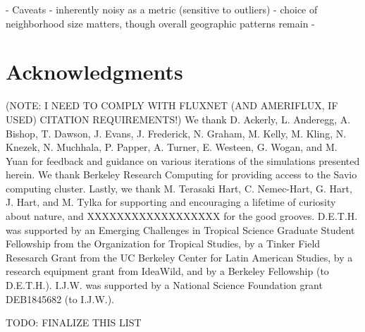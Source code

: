 \documentclass[12pt]{article}
\begin{document}
- Caveats
  - inherently noisy as a metric (sensitive to outliers)
  - choice of neighborhood size matters, though overall geographic patterns remain
  - 














\section*{Acknowledgments}

(NOTE: I NEED TO COMPLY WITH FLUXNET (AND AMERIFLUX, IF USED) CITATION REQUIREMENTS!) We thank D. Ackerly, L. Anderegg, A. Bishop, T. Dawson, J. Evans, J. Frederick, N. Graham, M. Kelly, M. Kling, N. Knezek, N. Muchhala, P. Papper, A. Turner, E. Westeen, G. Wogan, and M. Yuan for feedback and guidance on various iterations of the simulations presented herein. We thank Berkeley Research Computing for providing access to the Savio computing cluster. Lastly, we thank M. Terasaki Hart, C. Nemec-Hart, G. Hart, J. Hart, and M. Tylka for supporting and encouraging a lifetime of curiosity about nature, and XXXXXXXXXXXXXXXXXX for the good grooves. D.E.T.H. was supported by an Emerging Challenges in Tropical Science Graduate Student Fellowship from the Organization for Tropical Studies, by a Tinker Field Resesarch Grant from the UC Berkeley Center for Latin American Studies, by a research equipment grant from IdeaWild, and by a Berkeley Fellowship (to D.E.T.H.). I.J.W. was supported by a National Science Foundation grant DEB1845682 (to I.J.W.).

TODO: FINALIZE THIS LIST
\end{document}
